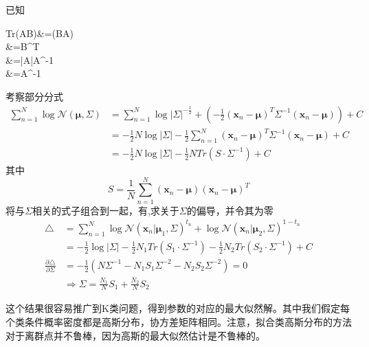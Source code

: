 \begin{enumerate}
	已知
	\begin{flalign}
		Tr(AB)&=(BA)\\
		&=B^T\\
		&=|A|A^{-1}\\
		&=A^{-1}
	\end{flalign}
	考察部分分式
	\begin{equation}
		\begin{aligned}
			\sum_{n=1}^{N}\log \mathcal{N}(\boldsymbol{\mu},\Sigma)			&=\sum_{n=1}^{N}\log |\Sigma|^{-\frac{1}{2}}+(-\frac{1}{2}(\boldsymbol{x}_n-\boldsymbol{\mu})^T\Sigma^{-1}(\boldsymbol{x}_n-\boldsymbol{\mu}))+C\\
			&=-\frac{1}{2}N\log |\Sigma| - \frac{1}{2}\sum_{n=1}^{N}(\boldsymbol{x}_n-\boldsymbol{\mu})^T\Sigma^{-1}(\boldsymbol{x}_n-\boldsymbol{\mu})+C\\
			&=-\frac{1}{2}N\log |\Sigma|-\frac{1}{2}N Tr(S\cdot \Sigma^{-1})+C
		\end{aligned}
	\end{equation}
	其中
	\begin{equation}
		S=\frac{1}{N}\sum_{n=1}^{N}(\boldsymbol{x}_n-\boldsymbol{\mu})(\boldsymbol{x}_n-\boldsymbol{\mu})^T
	\end{equation}
	将与$\Sigma$相关的式子组合到一起，有,求关于$\Sigma$的偏导，并令其为零
	\begin{equation}
		\begin{aligned}
		\triangle &= \sum_{n=1}^{N}\log \mathcal{N}(\boldsymbol{x}_n|\boldsymbol{\mu}_1,\Sigma)^{t_n}+\log\mathcal{N}(\boldsymbol{x}_n|\boldsymbol{\mu}_2,\Sigma)^{1-t_n}\\
		&=-\frac{1}{2}\log |\Sigma|-\frac{1}{2}N_1Tr(S_1\cdot \Sigma^{-1})-\frac{1}{2}N_2Tr(S_2\cdot \Sigma^{-1})+C\\
		\frac{\partial \triangle}{\partial \Sigma}&=-\frac{1}{2}(N\Sigma^{-1}-N_1S_1\Sigma^{-2}-N_2S_2\Sigma^{-2})=0\\
		&\Rightarrow \Sigma=\frac{N_1}{N}S_1+\frac{N_2}{N}S_2
		\end{aligned}
	\end{equation}
\end{enumerate}

这个结果很容易推广到K类问题，得到参数的对应的最大似然解。其中我们假定每个类条件概率密度都是高斯分布，协方差矩阵相同。注意，拟合类高斯分布的方法对于离群点并不鲁棒，因为高斯的最大似然估计是不鲁棒的。
